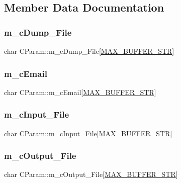 \subsection{Member Data Documentation}
\mbox{\label{classCParam_a805e2481ff9cb3c41bcf54a5fa29e816}} 
\subsubsection{\texorpdfstring{m\_cDump\_File}{m\_cDump\_File}}
{\footnotesize\ttfamily char C\+Param\+::m\+\_\+c\+Dump\+\_\+\+File\mbox{[}\mbox{\hyperlink{BoxRouter_8h_a8e4ff1be9df93e25b23e87d9042634e4}{M\+A\+X\+\_\+\+B\+U\+F\+F\+E\+R\+\_\+\+S\+TR}}\mbox{]}}

\mbox{\label{classCParam_add7c32d17c8df057773a38f5a2e5859d}} 
\subsubsection{\texorpdfstring{m\_cEmail}{m\_cEmail}}
{\footnotesize\ttfamily char C\+Param\+::m\+\_\+c\+Email\mbox{[}\mbox{\hyperlink{BoxRouter_8h_a8e4ff1be9df93e25b23e87d9042634e4}{M\+A\+X\+\_\+\+B\+U\+F\+F\+E\+R\+\_\+\+S\+TR}}\mbox{]}}

\mbox{\label{classCParam_af16d603421e373c44ae695420da82ae4}} 
\subsubsection{\texorpdfstring{m\_cInput\_File}{m\_cInput\_File}}
{\footnotesize\ttfamily char C\+Param\+::m\+\_\+c\+Input\+\_\+\+File\mbox{[}\mbox{\hyperlink{BoxRouter_8h_a8e4ff1be9df93e25b23e87d9042634e4}{M\+A\+X\+\_\+\+B\+U\+F\+F\+E\+R\+\_\+\+S\+TR}}\mbox{]}}

\mbox{\label{classCParam_a0d3f9803c7859719ade8aa3cbfb705fb}} 
\subsubsection{\texorpdfstring{m\_cOutput\_File}{m\_cOutput\_File}}
{\footnotesize\ttfamily char C\+Param\+::m\+\_\+c\+Output\+\_\+\+File\mbox{[}\mbox{\hyperlink{BoxRouter_8h_a8e4ff1be9df93e25b23e87d9042634e4}{M\+A\+X\+\_\+\+B\+U\+F\+F\+E\+R\+\_\+\+S\+TR}}\mbox{]}}

